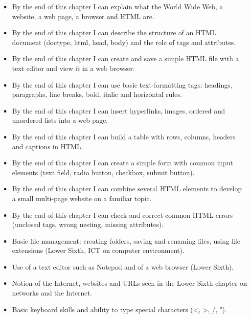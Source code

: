 \documentclass[11pt]{article}
\begin{document}
\begin{objectifs}
\begin{itemize}
\item By the end of this chapter I can explain what the World Wide Web, a website, a web page, a browser and HTML are.
\item By the end of this chapter I can describe the structure of an HTML document (doctype, html, head, body) and the role of tags and attributes.
\item By the end of this chapter I can create and save a simple HTML file with a text editor and view it in a web browser.
\item By the end of this chapter I can use basic text-formatting tags: headings, paragraphs, line breaks, bold, italic and horizontal rules.
\item By the end of this chapter I can insert hyperlinks, images, ordered and unordered lists into a web page.
\item By the end of this chapter I can build a table with rows, columns, headers and captions in HTML.
\item By the end of this chapter I can create a simple form with common input elements (text field, radio button, checkbox, submit button).
\item By the end of this chapter I can combine several HTML elements to develop a small multi-page website on a familiar topic.
\item By the end of this chapter I can check and correct common HTML errors (unclosed tags, wrong nesting, missing attributes).
\end{itemize}
\end{objectifs}

\begin{prerequis}
\begin{itemize}
\item Basic file management: creating folders, saving and renaming files, using file extensions (Lower Sixth, ICT on computer environment).
\item Use of a text editor such as Notepad and of a web browser (Lower Sixth).
\item Notion of the Internet, websites and URLs seen in the Lower Sixth chapter on networks and the Internet.
\item Basic keyboard skills and ability to type special characters (<, >, /, ").
\end{itemize}
\end{prerequis}
\end{document}
